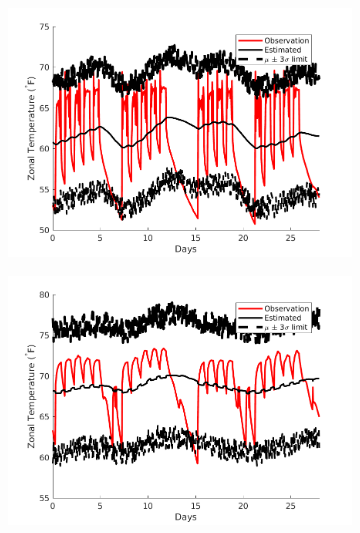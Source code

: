 \begin{figure}[H]
\begin{subfigure}{0.45\textwidth}
\centering
\includegraphics[width=\textwidth]{jbs_figures/zone_1}
\caption{}
\label{zone_1}
\end{subfigure}
\centering
\begin{subfigure}{0.45\textwidth}
\includegraphics[width=\textwidth]{jbs_figures/zone_2}
\caption{}
\label{zone_2}
\end{subfigure} \\
\begin{subfigure}{0.45\textwidth}
\centering

\end{subfigure}
\end{figure}
